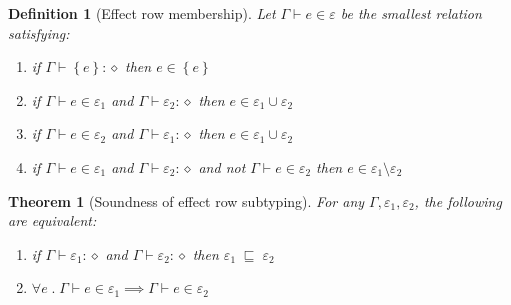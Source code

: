 \documentclass[12pt]{article}
\newtheorem{definition}{Definition}
\newtheorem{theorem}{Theorem}
\newcommand\anno[2]{#1 : #2}
\newcommand\row{\varepsilon}
\newcommand\tsingleton[1]{\left\{ #1 \right\}}
\newcommand\tunion[2]{#1 \cup #2}
\newcommand\tdiff[2]{#1 \setminus #2}
\newcommand\krow{\diamond}
\newcommand\context{\Gamma}
\newcommand\effect{e}
\newcommand\hastype[3]{#1 \vdash \anno{#2}{#3}}
\newcommand\subtype[2]{#1 \; \sqsubseteq \; #2}
\begin{document}
        \begin{definition}[Effect row membership]
          Let $\context \vdash \effect \in \row$ be the smallest relation satisfying:
          \begin{enumerate}
            \item if $\hastype{\context}{\tsingleton{\effect}}{\krow}$ then $\effect \in \tsingleton{\effect}$
            \item if $\context \vdash \effect \in \row_1$ and $\hastype{\context}{\row_2}{\krow}$ then $\effect \in \tunion{\row_1}{\row_2}$
            \item if $\context \vdash \effect \in \row_2$ and $\hastype{\context}{\row_1}{\krow}$ then $\effect \in \tunion{\row_1}{\row_2}$
            \item if $\context \vdash \effect \in \row_1$ and $\hastype{\context}{\row_2}{\krow}$ and not $\context \vdash \effect \in \row_2$ then $\effect \in \tdiff{\row_1}{\row_2}$
          \end{enumerate}
        \end{definition}

        \begin{theorem}[Soundness of effect row subtyping]
          For any $\context, \row_1, \row_2$, the following are equivalent:
          \begin{enumerate}
            \item if $\hastype{\context}{\row_1}{\krow}$ and $\hastype{\context}{\row_2}{\krow}$ then $\subtype{\row_1}{\row_2}$
            \item $\forall \effect \;.\; \context \vdash \effect \in \row_1 \implies \context \vdash \effect \in \row_2$
          \end{enumerate}
        \end{theorem}
\end{document}
